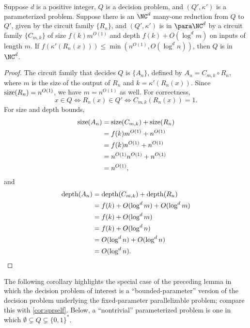 \begin{lemma}\label{lem:reducetonc}
  Suppose $d$ is a positive integer, $Q$ is a decision problem, and $(Q', \kappa')$ is a parameterized problem.
  Suppose there is an $\NC^d$ many-one reduction from $Q$ to $Q'$, given by the circuit family $\{R_n\}$, and $(Q', \kappa')$ is in $\para \NC^d$ by a circuit family $\{C_{m, k}\}$ of size $f(k) m^{O(1)}$ and depth $f(k) + O(\log^d m)$ on inputs of length $m$.
  If $f(\kappa'(R_n(x))) \leq \min(n^{O(1)}, O(\log^d n))$, then $Q$ is in $\NC^d$.
\end{lemma}
\begin{proof}
  The circuit family that decides $Q$ is $\{A_n\}$, defined by $A_n = C_{m, k} \circ R_n$, where $m$ is the size of the output of $R_n$ and $k = \kappa'(R_n(x))$.
  Since $\operatorname{size}(R_n) = n^{O(1)}$, we have $m = n^{O(1)}$ as well.
  For correctness,
  \[
  x \in Q \iff R_n(x) \in Q' \iff C_{m, k}(R_n(x)) = 1.
  \]
  For size and depth bounds,
  \begin{align*}
    \operatorname{size}(A_n) & = \operatorname{size}(C_{m, k}) + \operatorname{size}(R_n) \\
    & = f(k) m^{O(1)} + n^{O(1)} \\
    & = f(k) n^{O(1)} + n^{O(1)} \\
    & = n^{O(1)} n^{O(1)} + n^{O(1)} \\
    & = n^{O(1)},
  \end{align*}
  and
  \begin{align*}
    \operatorname{depth}(A_n) & = \operatorname{depth}(C_{m, k}) + \operatorname{depth}(R_n) \\
    & = f(k) + O(\log^d m) + O(\log^d m) \\
    & = f(k) + O(\log^d m) \\
    & = f(k) + O(\log^d n) \\
    & = O(\log^d n) + O(\log^d n) \\
    & = O(\log^d n). \qedhere
  \end{align*}
\end{proof}

The following corollary highlights the special case of the preceding lemma in which the decision problem of interest is a ``bounded-parameter'' version of the decision problem underlying the fixed-parameter parallelizable problem; compare this with \autoref{cor:sprself}.
Below, a ``nontrivial'' parameterized problem is one in which $\emptyset \subsetneq Q \subsetneq \{0, 1\}^*$.

